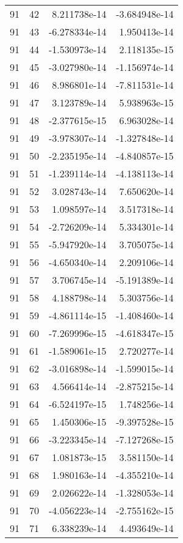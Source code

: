 \begin{tabular}{rrrr}
  91 &   42 &  8.211738e-14 & -3.684948e-14 \\
  91 &   43 & -6.278334e-14 &  1.950413e-14 \\
  91 &   44 & -1.530973e-14 &  2.118135e-15 \\
  91 &   45 & -3.027980e-14 & -1.156974e-14 \\
  91 &   46 &  8.986801e-14 & -7.811531e-14 \\
  91 &   47 &  3.123789e-14 &  5.938963e-15 \\
  91 &   48 & -2.377615e-15 &  6.963028e-14 \\
  91 &   49 & -3.978307e-14 & -1.327848e-14 \\
  91 &   50 & -2.235195e-14 & -4.840857e-15 \\
  91 &   51 & -1.239114e-14 & -4.138113e-14 \\
  91 &   52 &  3.028743e-14 &  7.650620e-14 \\
  91 &   53 &  1.098597e-14 &  3.517318e-14 \\
  91 &   54 & -2.726209e-14 &  5.334301e-14 \\
  91 &   55 & -5.947920e-14 &  3.705075e-14 \\
  91 &   56 & -4.650340e-14 &  2.209106e-14 \\
  91 &   57 &  3.706745e-14 & -5.191389e-14 \\
  91 &   58 &  4.188798e-14 &  5.303756e-14 \\
  91 &   59 & -4.861114e-15 & -1.408460e-14 \\
  91 &   60 & -7.269996e-15 & -4.618347e-15 \\
  91 &   61 & -1.589061e-15 &  2.720277e-14 \\
  91 &   62 & -3.016898e-14 & -1.599015e-14 \\
  91 &   63 &  4.566414e-14 & -2.875215e-14 \\
  91 &   64 & -6.524197e-15 &  1.748256e-14 \\
  91 &   65 &  1.450306e-15 & -9.397528e-15 \\
  91 &   66 & -3.223345e-14 & -7.127268e-15 \\
  91 &   67 &  1.081873e-15 &  3.581150e-14 \\
  91 &   68 &  1.980163e-14 & -4.355210e-14 \\
  91 &   69 &  2.026622e-14 & -1.328053e-14 \\
  91 &   70 & -4.056223e-14 & -2.755162e-15 \\
  91 &   71 &  6.338239e-14 &  4.493649e-14 \\

\end{tabular}
